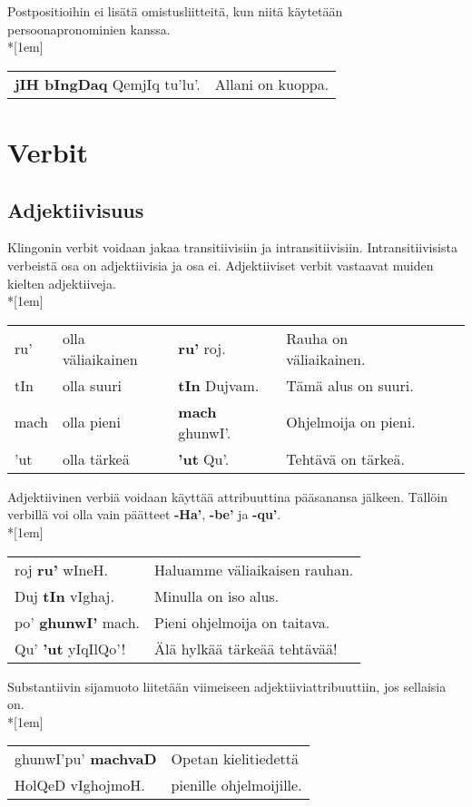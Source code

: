 \documentclass{book}
\begin{document}
Postpositioihin ei lisätä omistusliitteitä, kun niitä käytetään persoonapronominien kanssa.\\*[1em]
\begin{tabular}{l l}
    \textbf{jIH bIngDaq} QemjIq tu'lu'. & Allani on kuoppa.
\end{tabular}

\chapter{Verbit}

\section{Adjektiivisuus}

Klingonin verbit voidaan jakaa transitiivisiin ja intransitiivisiin.
Intransitiivisista verbeistä osa on adjektiivisia ja osa ei.
Adjektiiviset verbit vastaavat muiden kielten adjektiiveja.
\\*[1em]
\begin{tabular}{Bl Il | l l}
    ru' & olla väliaikainen & \textbf{ru'} roj. & Rauha on väliaikainen. \\
    tIn & olla suuri & \textbf{tIn} Dujvam. & Tämä alus on suuri. \\
    mach & olla pieni & \textbf{mach} ghunwI'. & Ohjelmoija on pieni. \\
    'ut & olla tärkeä & \textbf{'ut} Qu'. & Tehtävä on tärkeä. \\
\end{tabular}

Adjektiivinen verbiä voidaan käyttää attribuuttina pääsanansa jälkeen.
Tällöin verbillä voi olla vain päätteet \textbf{-Ha'}, \textbf{-be'} ja \textbf{-qu'}.\\*[1em]
\begin{tabular}{l l}
    roj \textbf{ru'} wIneH. & Haluamme väliaikaisen rauhan. \\
    Duj \textbf{tIn} vIghaj. & Minulla on iso alus. \\
    po' \textbf{ghunwI'} mach. & Pieni ohjelmoija on taitava. \\
    Qu' \textbf{'ut} yIqIlQo'! & Älä hylkää tärkeää tehtävää! \\
\end{tabular}

Substantiivin sijamuoto liitetään viimeiseen adjektiiviattribuuttiin, jos sellaisia on.\\*[1em]
\begin{tabular}{l l}
    ghunwI'pu' \textbf{machvaD} & Opetan kielitiedettä \\
    HolQeD vIghojmoH. & pienille ohjelmoijille. \\ 
\end{tabular}
\end{document}
